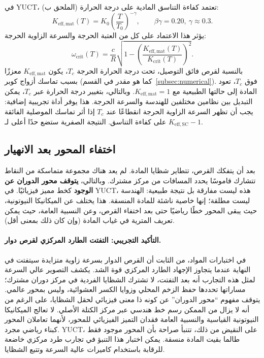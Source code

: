\documentclass[12pt,a4paper]{article}
\newcommand{\Keffmat}{K_{\mathrm{eff,mat}}}
\begin{document}
	في YUCT، تعتمد كفاءة التناسق المادية على درجة الحرارة (الملحق ب):
	\[
	K_{\mathrm{eff,mat}}(T) = K_0 \left( \frac{T}{T_0} \right)^{-\gamma}, \qquad \beta\gamma = 0.20,\ \gamma \approx 0.3.
	\]
	يؤثر هذا الاعتماد على كل من العتبة الحرجة والسرعة الزاوية الحرجة:
	\[
	\omega_{\text{crit}}(T) = \frac{c}{R} \sqrt{1 - \left( \frac{K_{\mathrm{eff,mat}}(T)}{K_{\mathrm{crit}}(T)} \right)^2 }.
	\]
	بالنسبة لقرص فائق التوصيل، تحت درجة الحرارة الحرجة \(T_c\)، يكون \(\Keffmat\) معززًا بسبب تماسك أزواج كوبر (كما هو مقدر في القسم~\ref{subsec:numerical}). فوق \(T_c\)، تعود المادة إلى حالتها الطبيعية مع \(\Keffmat = 1\). وبالتالي، بتغيير درجة الحرارة عبر \(T_c\)، يمكن التبديل بين نظامين مختلفين للهندسة والسرعة الحرجة. هذا يوفر أداة تجريبية إضافية: يجب أن تظهر السرعة الزاوية الحرجة انقطاعًا عند \(T_c\) إذا أثر تماسك الموصلية الفائقة على كفاءة التناسق. النتيجة الصفرية ستضع حدًا أعلى لـ \(K_{\mathrm{eff,SC}} - 1\).
	
	\subsection{اختفاء المحور بعد الانهيار}
	
	بعد أن يتفكك القرص، تتطاير شظايا المادة. لم يعد هناك مجموعة متماسكة من النقاط تتشارك قاموسًا يحدد المسافات من مركز مشترك. وبالتالي، \textbf{يتوقف محور الدوران عن الوجود} كخط مميز فيزيائيًا. في YUCT، هذه ليست مفارقة بل نتيجة طبيعية: الهندسة ليست مطلقة؛ إنها خاصية ناشئة للمادة المنسقة. هذا يختلف عن الميكانيكا النيوتونية، حيث يبقى المحور خطًا رياضيًا حتى بعد اختفاء القرص، وعن النسبية العامة، حيث يمكن تعريف المترية في غياب المادة (وإن كان ذلك بمعنى أقل).
	
	\paragraph{التأكيد التجريبي: التفتت الطارد المركزي لقرص دوار.}
	في اختبارات المواد، من الثابت أن القرص الدوار بسرعة زاوية متزايدة سيتفتت في النهاية عندما يتجاوز الإجهاد الطارد المركزي قوة الشد. يكشف التصوير عالي السرعة لمثل هذه التجارب أنه بعد التفتت، لا تشترك الشظايا الفردية في مركز دوران مشترك؛ مساراتها تحددها حفظ الزخم المحلي وزوايا الكسر العشوائية، وليس بمحور عالمي. يتوقف مفهوم ``محور الدوران'' عن كونه ذا معنى فيزيائي لحقل الشظايا، على الرغم من أنه لا يزال من الممكن رسم خط هندسي عبر مركز الكتلة الأصلي. لا تعالج الميكانيكا النيوتونية القياسية والنسبية العامة فقدان التميز الفيزيائي للمحور، لأنهما تعاملان المحور كبناء رياضي مجرد. YUCT، على النقيض من ذلك، تتنبأ صراحة بأن المحور موجود فقط طالما بقيت المادة منسقة. يمكن اختبار هذا التنبؤ في تجارب طرد مركزي خاضعة للرقابة باستخدام كاميرات عالية السرعة وتتبع الشظايا.
	
\end{document}
